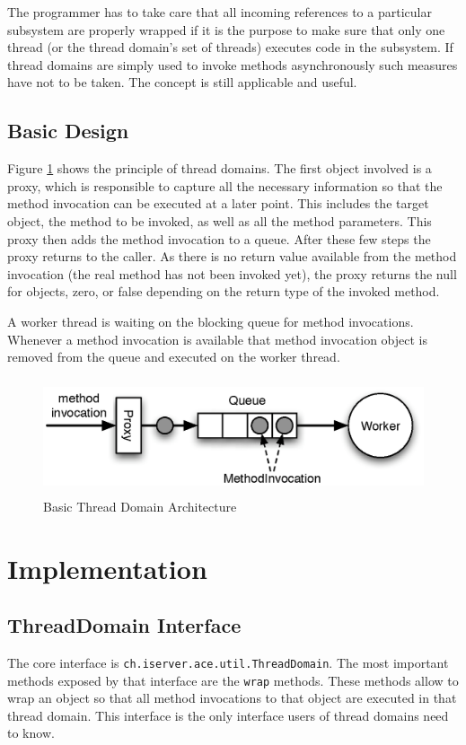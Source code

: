 The programmer has to take care that all incoming references
to a particular subsystem are properly wrapped if it is the purpose to
make sure that only one thread (or the thread domain's set of threads)
executes code in the subsystem. If thread domains are simply used to
invoke methods asynchronously such measures have not to be taken. The
concept is still applicable and useful.


\subsection{Basic Design}
\label{sect:threaddomain.introduction.principle}
Figure \ref{fig:threaddomain_basic} shows the principle of thread domains.
The first object involved is a proxy, which is responsible to
capture all the necessary information so that the method invocation can
be executed at a later point. This includes the target object, the method
to be invoked, as well as all the method parameters. This proxy then adds
the method invocation to a queue. After these few steps the proxy returns
to the caller. As there is no return value available from the method 
invocation (the real method has not been invoked yet), the proxy returns
the null for objects, zero, or false depending on the return type of the
invoked method.

A worker thread is waiting on the blocking queue for method invocations.
Whenever a method invocation is available that method invocation object
is removed from the queue and executed on the worker thread.

\begin{figure}[H]
 \centering
 \includegraphics[width=13cm,height=3.4cm]{../images/finalreport/threaddomain_basic.eps}
 \caption{Basic Thread Domain Architecture}
 \label{fig:threaddomain_basic}
\end{figure}



\section{Implementation}

\subsection{ThreadDomain Interface}
The core interface is \texttt{ch.iserver.ace.util.ThreadDomain}.
The most important methods exposed by that interface are the \texttt{wrap}
methods. These methods allow to wrap an object so that all method invocations
to that object are executed in that thread domain. This interface is the only 
interface users of thread domains need to know.

